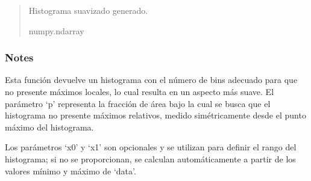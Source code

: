 \documentclass[letterpaper,10pt,english]{sphinxmanual}
\begin{document}
\begin{fulllineitems}
\begin{quote}
\begin{description}
\begin{itemize}
\end{itemize}

\sphinxAtStartPar
Histograma suavizado generado.

\sphinxAtStartPar
numpy.ndarray

\end{description}\end{quote}
\subsubsection*{Notes}

\sphinxAtStartPar
Esta función devuelve un histograma con el número de bins adecuado para que no presente máximos locales,
lo cual resulta en un aspecto más suave. El parámetro ‘p’ representa la fracción de área bajo la cual
se busca que el histograma no presente máximos relativos, medido simétricamente desde el punto máximo
del histograma.

\sphinxAtStartPar
Los parámetros ‘x0’ y ‘x1’ son opcionales y se utilizan para definir el rango del histograma; si no se
proporcionan, se calculan automáticamente a partir de los valores mínimo y máximo de ‘data’.

\end{fulllineitems}

\end{document}
